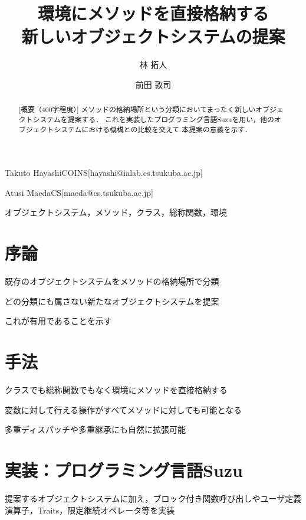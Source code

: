 \documentclass{ipsjprosym}
\begin{document}
\title{環境にメソッドを直接格納する \\ 新しいオブジェクトシステムの提案}


\author{林 拓人}{Takuto Hayashi}{COINS}[hayashi@ialab.cs.tsukuba.ac.jp]
\author{前田 敦司}{Atusi Maeda}{CS}[maeda@cs.tsukuba.ac.jp]

\begin{abstract}
[概要（400字程度）]
メソッドの格納場所という分類においてまったく新しいオブジェクトシステムを提案する．
これを実装したプログラミング言語Suzuを用い，他のオブジェクトシステムにおける機構との比較を交えて
本提案の意義を示す．
\end{abstract}

\begin{jkeyword}
オブジェクトシステム，メソッド，クラス，総称関数，環境
\end{jkeyword}

\maketitle

\section{序論}

既存のオブジェクトシステムをメソッドの格納場所で分類

どの分類にも属さない新たなオブジェクトシステムを提案

これが有用であることを示す

\section{手法}

クラスでも総称関数でもなく環境にメソッドを直接格納する

変数に対して行える操作がすべてメソッドに対しても可能となる

多重ディスパッチや多重継承にも自然に拡張可能

\section{実装：プログラミング言語Suzu}

提案するオブジェクトシステムに加え，ブロック付き関数呼び出しやユーザ定義演算子，Traits，限定継続オペレータ等を実装
\end{document}
